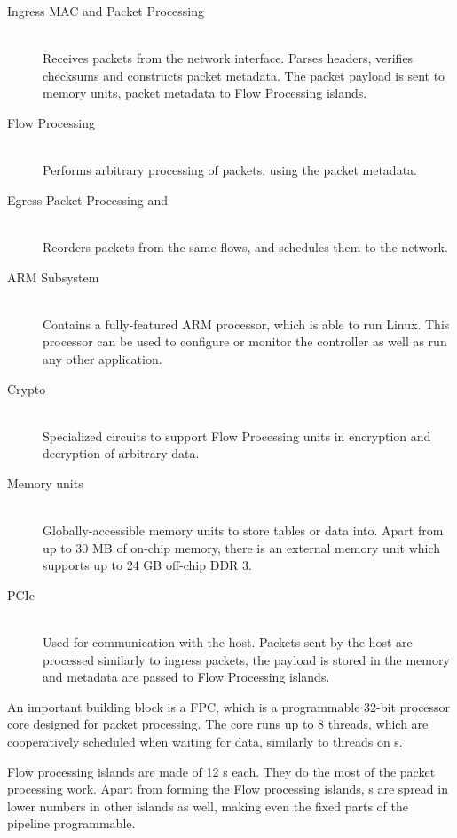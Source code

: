 \begin{description}
	\item[Ingress MAC and Packet Processing] \hfill \\
		Receives packets from the network interface. Parses headers, verifies
		checksums and constructs packet metadata. The packet payload is sent to
		memory units, packet metadata to Flow Processing islands.
	\item[Flow Processing] \hfill \\
		Performs arbitrary processing of packets, using the packet metadata.
	\item[Egress Packet Processing and ] \hfill \\
		Reorders packets from the same flows, and schedules them to the network.
	\item[ARM Subsystem] \hfill \\
		Contains a fully-featured ARM processor, which is able to run Linux.
		This processor can be used to configure or monitor the controller as
		well as run any other application.
	\item[Crypto] \hfill \\
		Specialized circuits to support Flow Processing units in encryption and
		decryption of arbitrary data.
	\item[Memory units] \hfill \\
		Globally-accessible memory units to store tables or data into. Apart
		from up to 30 MB of on-chip memory, there is an external memory unit which
		supports up to 24 GB off-chip DDR 3.
	\item[PCIe] \hfill \\
		Used for communication with the host. Packets sent by the host are
		processed similarly to ingress packets, the payload is stored in the
		memory and metadata are passed to Flow Processing islands.
\end{description}

\noindent An important building block is a \acrfull{FPC}, which is a programmable 32-bit
processor core designed for packet processing. The core runs up to 8 threads,
which are cooperatively scheduled when waiting for data, similarly to threads
on s.

Flow processing islands are made of 12 s each. They do the most of the
packet processing work. Apart from forming the Flow processing islands,
s are spread in lower numbers in other islands as well, making even the
fixed parts of the pipeline programmable.

